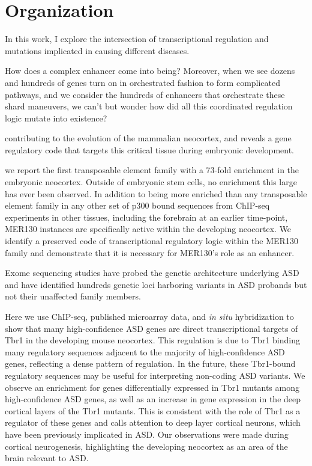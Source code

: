 \section{Organization}

In this work, I explore the intersection of transcriptional regulation and mutations implicated in causing different diseases.

How does a complex enhancer come into being? Moreover, when we see dozens and hundreds of genes turn on in orchestrated fashion to form complicated pathways, and we consider the hundreds of enhancers that orchestrate these shard maneuvers, we can’t but wonder how did all this coordinated regulation logic mutate into existence?


contributing to the evolution of the mammalian neocortex, and reveals a gene regulatory code that targets this critical tissue during embryonic development. 

we report the first transposable element family with a 73-fold enrichment in the embryonic neocortex. Outside of embryonic stem cells, no enrichment this large has ever been observed. In addition to being more enriched than any transposable element family in any other set of p300 bound sequences from ChIP-seq experiments in other tissues, including the forebrain at an earlier time-point, MER130 instances are specifically active within the developing neocortex. We identify a preserved code of transcriptional regulatory logic within the MER130 family and demonstrate that it is necessary for MER130’s role as an enhancer.

 Exome sequencing studies have probed the genetic architecture underlying ASD and have identified hundreds genetic loci harboring variants in ASD probands but not their unaffected family members.

Here we use ChIP-seq, published microarray data, and \emph{in situ} hybridization to show that many high-confidence ASD genes are direct transcriptional targets of Tbr1 in the developing mouse neocortex. This regulation is due to Tbr1 binding many regulatory sequences adjacent to the majority of high-confidence ASD genes, reflecting a dense pattern of regulation. In the future, these Tbr1-bound regulatory sequences may be useful for interpreting non-coding ASD variants. We observe an enrichment for genes differentially expressed in Tbr1 mutants among high-confidence ASD genes, as well as an increase in gene expression in the deep cortical layers of the Tbr1 mutants. This is consistent with the role of Tbr1 as a regulator of these genes and calls attention to deep layer cortical neurons, which have been previously implicated in ASD. Our observations were made during cortical neurogenesis, highlighting the developing neocortex as an area of the brain relevant to ASD. 

